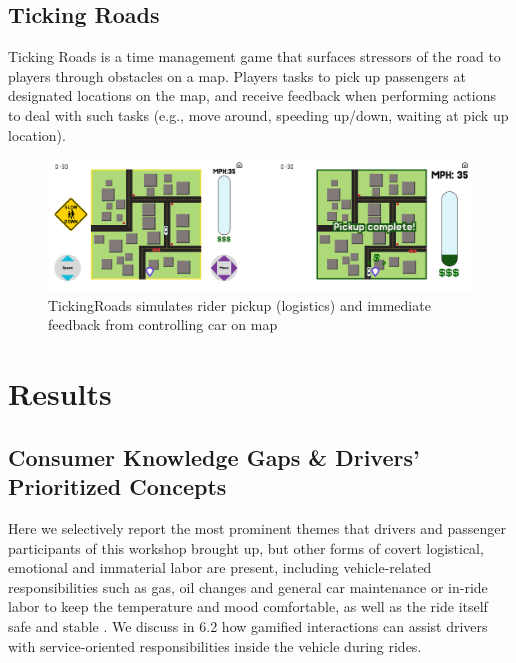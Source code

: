 \subsection{Ticking Roads} 
Ticking Roads is a time management game that surfaces stressors of the road to players through obstacles on a map. Players tasks to pick up passengers at designated locations on the map, and receive feedback when performing actions to deal with such tasks (e.g., move around, speeding up/down, waiting at pick up location).
\FloatBarrier
\begin{figure}[h!]
    \centering
\includegraphics[width=.9\linewidth]{Chapters/figures/ticking.png}
    \caption{TickingRoads simulates rider pickup (logistics) and immediate feedback from controlling car on map}
    \label{ticking}
\end{figure}
\FloatBarrier

\section{Results}

\subsection{Consumer Knowledge Gaps \& Drivers' Prioritized Concepts} \label{pay}
Here we selectively report the most prominent themes that drivers and passenger participants of this workshop brought up, but other forms of covert logistical, emotional and immaterial labor are present, including vehicle-related responsibilities such as gas, oil changes and general car maintenance or in-ride labor to keep the temperature and mood comfortable, as well as the ride itself safe and stable . We discuss in 6.2 how gamified interactions can assist drivers with service-oriented responsibilities inside the vehicle during rides.

